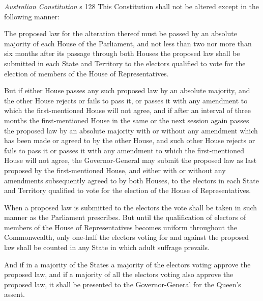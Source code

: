 \begin{statutedetails}{\textit{Australian Constitution} s 128}\label{Constitution s 128}
    \flushleft
    This Constitution shall not be altered except in the following manner:

    \vspace{\baselineskip}

    The proposed law for the alteration thereof must be passed by an absolute majority of each House of the Parliament, and not less than two nor more than six months after its passage through both Houses the proposed law shall be submitted in each State and Territory to the electors qualified to vote for the election of members of the House of Representatives.

    \vspace{\baselineskip}

    But if either House passes any such proposed law by an absolute majority, and the other House rejects or fails to pass it, or passes it with any amendment to which the first-mentioned House will not agree, and if after an interval of three months the first-mentioned House in the same or the next session again passes the proposed law by an absolute majority with or without any amendment which has been made or agreed to by the other House, and such other House rejects or fails to pass it or passes it with any amendment to which the first-mentioned House will not agree, the Governor-General may submit the proposed law as last proposed by the first-mentioned House, and either with or without any amendments subsequently agreed to by both Houses, to the electors in each State and Territory qualified to vote for the election of the House of Representatives.

    \vspace{\baselineskip}

    When a proposed law is submitted to the electors the vote shall be taken in such manner as the Parliament prescribes. But until the qualification of electors of members of the House of Representatives becomes uniform throughout the Commonwealth, only one-half the electors voting for and against the proposed law shall be counted in any State in which adult suffrage prevails.

    \vspace{\baselineskip}

    And if in a majority of the States a majority of the electors voting approve the proposed law, and if a majority of all the electors voting also approve the proposed law, it shall be presented to the Governor-General for the Queen's assent.


\end{statutedetails}
